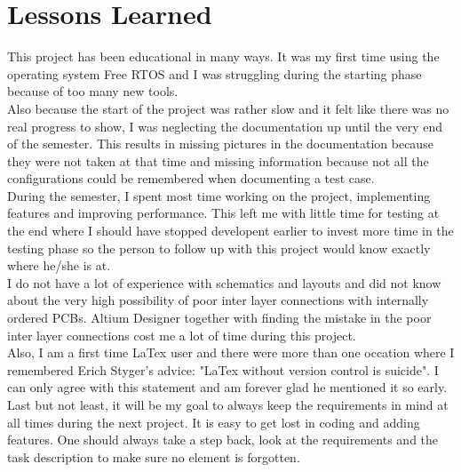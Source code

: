 \section{Lessons Learned}
This project has been educational in many ways. It was my first time using the operating system Free RTOS and I was struggling during the starting phase because of too many new tools.\\
Also because the start of the project was rather slow and it felt like there was no real progress to show, I was neglecting the documentation up until the very end of the semester. This results in missing pictures in the documentation because they were not taken at that time and missing information because not all the configurations could be remembered when documenting a test case.\\
During the semester, I spent most time working on the project, implementing features and improving performance. This left me with little time for testing at the end where I should have stopped developent earlier to invest more time in the testing phase so the person to follow up with this project would know exactly where he/she is at.\\
I do not have a lot of experience with schematics and layouts and did not know about the very high possibility of poor inter layer connections with internally ordered PCBs. Altium Designer together with finding the mistake in the poor inter layer connections cost me a lot of time during this project.\\
Also, I am a first time LaTex user and there were more than one occation where I remembered Erich Styger's advice: "LaTex without version control is suicide". I can only agree with this statement and am forever glad he mentioned it so early.\\
Last but not least, it will be my goal to always keep the requirements in mind at all times during the next project. It is easy to get lost in coding and adding features. One should always take a step back, look at the requirements and the task description to make sure no element is forgotten. 